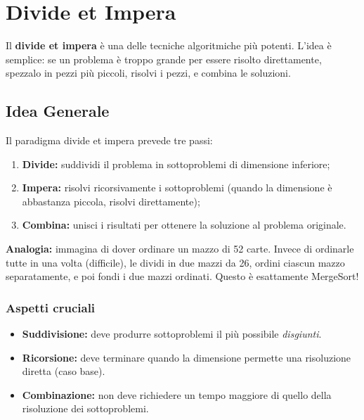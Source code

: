 \section{Divide et Impera}

\begin{softnote}
	Il \textbf{divide et impera} è una delle tecniche algoritmiche
	più potenti. L'idea è semplice: se un problema è troppo grande
	per essere risolto direttamente, spezzalo in pezzi più piccoli,
	risolvi i pezzi, e combina le soluzioni.
\end{softnote}
\subsection{Idea Generale}

Il paradigma divide et impera prevede tre passi:
\begin{enumerate}
	\item \textbf{Divide:} suddividi il problema in sottoproblemi
	di dimensione inferiore;
	\item \textbf{Impera:} risolvi ricorsivamente i sottoproblemi
	(quando la dimensione è abbastanza piccola, risolvi
	direttamente);
	\item \textbf{Combina:} unisci i risultati per ottenere
	la soluzione al problema originale.
\end{enumerate}

\begin{nota}
	\textbf{Analogia:} immagina di dover ordinare un mazzo di 52 carte.
	Invece di ordinarle tutte in una volta (difficile), le dividi in
	due mazzi da 26, ordini ciascun mazzo separatamente, e poi fondi
	i due mazzi ordinati. Questo è esattamente MergeSort!
\end{nota}

\subsubsection*{Aspetti cruciali}

\begin{itemize}
	\item \textbf{Suddivisione:} deve produrre sottoproblemi il più
	possibile \textit{disgiunti}.
	\item \textbf{Ricorsione:} deve terminare quando la dimensione
	permette una risoluzione diretta (caso base).
	\item \textbf{Combinazione:} non deve richiedere un tempo
	maggiore di quello della risoluzione dei sottoproblemi.
\end{itemize}

